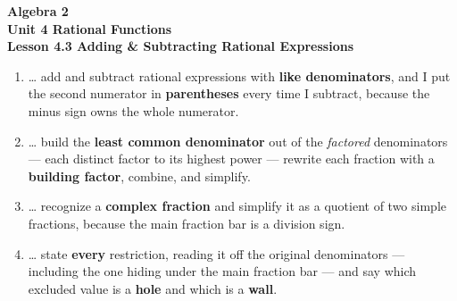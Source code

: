\documentclass[10pt]{article}
\begin{document}
\vspace{-0.8in}

\begin{center}
  {\color{white}\textbf{\LARGE Algebra 2}}\\[4pt]
  {\color{forestmid}\large\textbf{Unit 4 \quad Rational Functions}}\\[6pt]
  {\color{white}\textbf{\large Lesson 4.3 \quad Adding \& Subtracting Rational Expressions}}
\end{center}

\vspace{0.22in}
\namedateperiod
\vspace{0.18in}

\begin{learningtargetbox}
\small
\begin{enumerate}[leftmargin=1.5em, itemsep=5pt]
  \item \ldots{} add and subtract rational expressions with \textbf{like denominators}, and I put the second numerator in \textbf{parentheses} every time I subtract, because the minus sign owns the whole numerator.
  \item \ldots{} build the \textbf{least common denominator} out of the \emph{factored} denominators --- each distinct factor to its highest power --- rewrite each fraction with a \textbf{building factor}, combine, and simplify.
  \item \ldots{} recognize a \textbf{complex fraction} and simplify it as a quotient of two simple fractions, because the main fraction bar is a division sign.
  \item \ldots{} state \textbf{every} restriction, reading it off the original denominators --- including the one hiding under the main fraction bar --- and say which excluded value is a \textbf{hole} and which is a \textbf{wall}.
\end{enumerate}
\end{learningtargetbox}

\vspace{0.14in}
\end{document}
